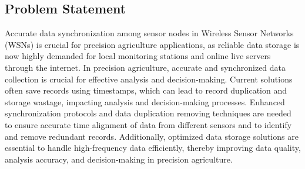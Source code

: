 \subsection*{Problem Statement}
Accurate data synchronization among sensor nodes in Wireless Sensor Networks (WSNs) is crucial for precision agriculture applications, as reliable data storage is now highly demanded for local monitoring stations and online live servers through the internet. In precision agriculture, accurate and synchronized data collection is crucial for effective analysis and decision-making. Current solutions often save records using timestamps, which can lead to record duplication and storage wastage, impacting analysis and decision-making processes. Enhanced synchronization protocols and data duplication removing techniques are needed to ensure accurate time alignment of data from different sensors and to identify and remove redundant records. Additionally, optimized data storage solutions are essential to handle high-frequency data efficiently, thereby improving data quality, analysis accuracy, and decision-making in precision agriculture.